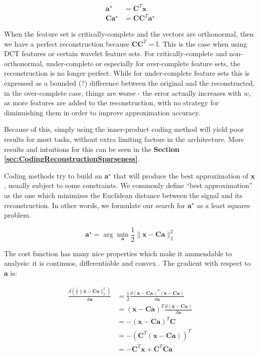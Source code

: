 \documentclass[12pt,a4paper,oneside,english]{UPBThesis}
\begin{document}
\begin{align*}
\textbf{a}^\star & = \textbf{C}^T\textbf{x} \\
\textbf{C}\textbf{a}^\star & = \textbf{C}\textbf{C}^T\textbf{a}^\star
\end{align*}

When the feature set is critically-complete and the vectors are orthonormal, then we have a perfect reconstruction because $\textbf{C}\textbf{C}^T = \mathbb{I}$. This is the case when using DCT features or certain wavelet feature sets. For critically-complete and non-orthonormal, under-complete or especially for over-complete feature sets, the reconstruction is no longer perfect. While for under-complete feature sets this is expressed as a bounded (?) difference between the original and the reconstructed, in the over-complete case, things are worse - the error actually increases with $w$, as more features are added to the reconstruction, with no strategy for diminuishing them in order to improve approximation accuracy.

Because of this, simply using the inner-product coding method will yield poor results for most tasks, without extra limiting factors in the architecture. More results and intuitions for this can be seen in the \textbf{Section \ref{sec:CodingReconstructionSparseness}}.

Coding methods try to build an $\textbf{a}^\star$ that will produce the best approximation of $\textbf{x}$, usually subject to some constraints. We commonly define ``best approximation'' as the one which minimizes the Euclidean distance between the signal and its reconstruction. In other words, we formulate our search for $\textbf{a}^\star$ as a least squares problem.

\begin{equation}
\textbf{a}^{\star} = \arg\min_{\textbf{a}} \frac{1}{2} \| \textbf{x} - \textbf{C}\textbf{a} \|_2^2
\end{equation}

The cost function has many nice properties which make it ammendable to analysis: it is continuos, differentiable and convex \cite{elements-statistical-learning}. The gradient with respect to $\textbf{a}$ is:

\begin{align*}
\frac{d \left( \frac{1}{2}\|\textbf{x} - \textbf{C}\textbf{a}\|_2^2 \right)}{d\textbf{a}} & = \frac{1}{2} \frac{d {\left( \textbf{x} - \textbf{C}\textbf{a} \right)}^T\left( \textbf{x} - \textbf{C}\textbf{a} \right)}{d\textbf{a}} \\
& = {\left( \textbf{x} - \textbf{C}\textbf{a} \right)}^T \frac{d \left( \textbf{x} - \textbf{C}\textbf{a} \right)}{d\textbf{a}} \\
& = - {\left( \textbf{x} - \textbf{C}\textbf{a} \right)}^T \textbf{C} \\
& = - {\left( \textbf{C}^T \left( \textbf{x} - \textbf{C}\textbf{a} \right) \right)}^T \\
& = - \textbf{C}^T \textbf{x} + \textbf{C}^T\textbf{C}\textbf{a}
\end{align*}
\end{document}
